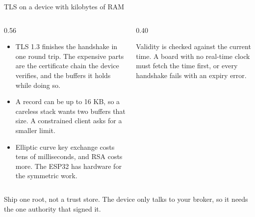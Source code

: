 \documentclass[10pt,aspectratio=169,t]{beamer}
\begin{document}
\begin{frame}[embedded,eyebrow=Trust]{TLS on a device with kilobytes of RAM}
  \begin{columns}[T]
    \begin{column}{0.56\textwidth}
      \begin{itemize}
        \item TLS 1.3 finishes the handshake in one round trip. The expensive parts are the certificate chain the device verifies, and the buffers it holds while doing so.
        \item A record can be up to 16 KB, so a careless stack wants two buffers that size. A constrained client asks for a smaller limit.
        \item Elliptic curve key exchange costs tens of milliseconds, and RSA costs more. The ESP32 has hardware for the symmetric work.
      \end{itemize}
    \end{column}
    \begin{column}{0.40\textwidth}
      \begin{hint}
        Validity is checked against the current time. A board with no real-time clock must fetch the time first, or every handshake fails with an expiry error.
      \end{hint}
    \end{column}
  \end{columns}
  \begin{takeaway}{Ship one root, not a trust store.}
    The device only talks to your broker, so it needs the one authority that signed it.
  \end{takeaway}
\end{frame}
\end{document}
